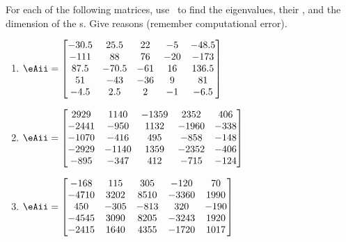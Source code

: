 \begin{exercise} \label{ex:} 
For each of the following matrices, use \script\ to find the eigenvalues, their , and the dimension of the s.  Give reasons (remember computational error).
\begin{enumerate}
\item \(\eAii=\begin{bmatrix} -30.5 & 25.5 & 22 & -5 & -48.5
\\-111 & 88 & 76 & -20 & -173
\\87.5 & -70.5 & -61 & 16 & 136.5
\\51 & -43 & -36 & 9 & 81
\\-4.5 & 2.5 & 2 & -1 & -6.5 \end{bmatrix}\)
\setbox\ajrqrbox\hbox{}\marginpar{\usebox{\ajrqrbox}}%

\item \(\eAii=\begin{bmatrix} 2929 & 1140 & -1359 & 2352 & 406
\\-2441 & -950 & 1132 & -1960 & -338
\\-1070 & -416 & 495 & -858 & -148
\\-2929 & -1140 & 1359 & -2352 & -406
\\-895 & -347 & 412 & -715 & -124 \end{bmatrix}\)
\setbox\ajrqrbox\hbox{}\marginpar{\usebox{\ajrqrbox}}%

\item \(\eAii=\begin{bmatrix} -168 & 115 & 305 & -120 & 70
\\-4710 & 3202 & 8510 & -3360 & 1990
\\450 & -305 & -813 & 320 & -190
\\-4545 & 3090 & 8205 & -3243 & 1920
\\-2415 & 1640 & 4355 & -1720 & 1017 \end{bmatrix}\)
\setbox\ajrqrbox\hbox{}\marginpar{\usebox{\ajrqrbox}}%


\end{enumerate}
\end{exercise}
